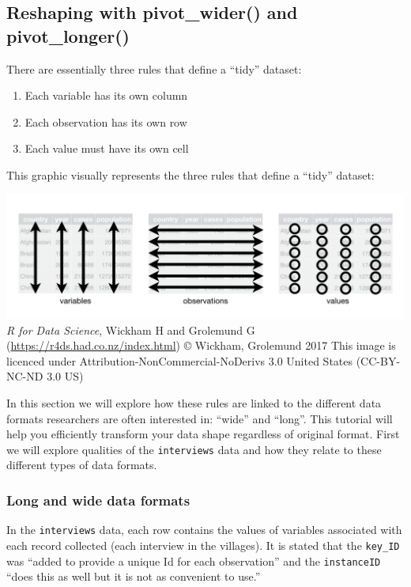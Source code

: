 \documentclass[
]{article}
\providecommand{\tightlist}{%
  \setlength{\itemsep}{0pt}\setlength{\parskip}{0pt}}
\begin{document}
\subsection{Reshaping with pivot\_wider() and
pivot\_longer()}\label{reshaping-with-pivot_wider-and-pivot_longer}

There are essentially three rules that define a ``tidy'' dataset:

\begin{enumerate}
\def\labelenumi{\arabic{enumi}.}
\tightlist
\item
  Each variable has its own column
\item
  Each observation has its own row
\item
  Each value must have its own cell
\end{enumerate}

This graphic visually represents the three rules that define a ``tidy''
dataset:

\includegraphics{fig/tidy-data-wickham.png} \emph{R for Data Science},
Wickham H and Grolemund G (\url{https://r4ds.had.co.nz/index.html}) ©
Wickham, Grolemund 2017 This image is licenced under
Attribution-NonCommercial-NoDerivs 3.0 United States (CC-BY-NC-ND 3.0
US)

In this section we will explore how these rules are linked to the
different data formats researchers are often interested in: ``wide'' and
``long''. This tutorial will help you efficiently transform your data
shape regardless of original format. First we will explore qualities of
the \texttt{interviews} data and how they relate to these different
types of data formats.

\subsubsection{Long and wide data
formats}\label{long-and-wide-data-formats}

In the \texttt{interviews} data, each row contains the values of
variables associated with each record collected (each interview in the
villages). It is stated that the \texttt{key\_ID} was ``added to provide
a unique Id for each observation'' and the \texttt{instanceID} ``does
this as well but it is not as convenient to use.''
\end{document}
